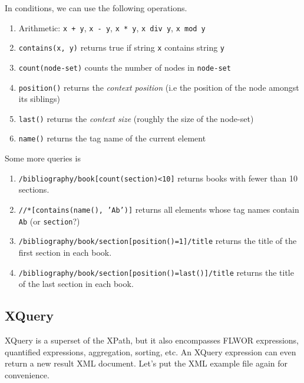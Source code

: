   \begin{definition}
    \label{def:xpath-operators-and-functions}
 
    In conditions, we can use the following operations. 
    \begin{enumerate}
      \item Arithmetic: \texttt{x + y}, \texttt{x - y}, \texttt{x * y}, \texttt{x div y}, \texttt{x mod y} 
      \item \texttt{contains(x, y)} returns true if string \texttt{x} contains string \texttt{y} 
      \item \texttt{count(node-set)} counts the number of nodes in \texttt{node-set} 
      \item \texttt{position()} returns the \textit{context position} (i.e the position of the node amongst its siblings) 
      \item \texttt{last()} returns the \textit{context size} (roughly the size of the node-set)
      \item \texttt{name()} returns the tag name of the current element
    \end{enumerate}
  \end{definition}

  \begin{example}
    \label{ex:further-xpath-queries}
    Some more queries is 
    \begin{enumerate}
      \item \texttt{/bibliography/book[count(section)<10]} returns books with fewer than 10 sections. 
      \item \texttt{//*[contains(name(), 'Ab')]} returns all elements whose tag names contain \texttt{Ab} (or \texttt{section}?) 
      \item \texttt{/bibliography/book/section[position()=1]/title} returns the title of the first section in each book. 
      \item \texttt{/bibliography/book/section[position()=last()]/title} returns the title of the last section in each book.
    \end{enumerate}
  \end{example}

\subsection{XQuery}
  
  XQuery is a superset of the XPath, but it also encompasses FLWOR  expressions, quantified expressions, aggregation, sorting, etc. An XQuery expression can even return a new result XML document. Let's put the XML example file again for convenience. 

